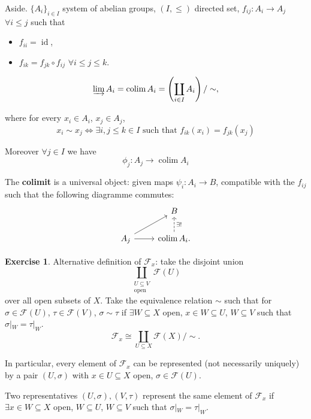 \documentclass[12pt]{article}
\DeclareMathOperator{\id}{id}
\DeclareMathOperator*{\colim}{colim}
\theoremstyle{definition}
\newtheorem*{exercise}{Exercise}
\theoremstyle{remark}
\begin{document}
Aside. $\{A_i\}_{i\in I}$ system of abelian groups, $(I,\leq)$ directed set, $f_{ij}:A_i\rightarrow A_j$ $\forall i\leq j$ such that
\begin{itemize}
\item $f_{ii}=\id$,
\item $f_{ik}=f_{jk}\circ f_{ij}$ $\forall i\leq j\leq k$.
\end{itemize}

\[\varinjlim A_i=\colim A_i=\left(\coprod_{i\in I}A_i\right)/\sim,\]

where for every $x_i\in A_i$, $x_j\in A_j$,
\[x_i\sim x_j\Leftrightarrow\exists i,j\leq k\in I\text{ such that }f_{ik}(x_i)=f_{jk}(x_j)\]

Moreover $\forall j\in I$ we have
\[\phi_j:A_j\longrightarrow\colim A_i\]

The \textbf{colimit} is a universal object: given maps $\psi_i:A_i\rightarrow B$, compatible with the $f_{ij}$ such that the following diagramme commutes:
\[
\begin{tikzcd}
&B\\
A_j\arrow[ru]\arrow[r]&\colim A_i.\arrow[u,dashed,"\exists!",swap]
\end{tikzcd}
\]

\begin{exercise}
Alternative definition of $\mathcal{F}_x$: take the disjoint union
\[\coprod_{\substack{U\subseteq V\\\text{open}}}\mathcal{F}(U)\]
over all open subsets of $X$. Take the equivalence relation $\sim$ such that for $\sigma\in\mathcal{F}(U)$, $\tau\in\mathcal{F}(V)$, $\sigma\sim\tau$ if $\exists W\subseteq X$ open, $x\in W\subseteq U$, $W\subseteq V$ such that $\sigma|_W=\tau|_W$.
\[\mathcal{F}_x\cong\coprod_{U\subseteq X}\mathcal{F}(X)/\sim.\]

In particular, every element of $\mathcal{F}_x$ can be represented (not necessarily uniquely) by a pair $(U,\sigma)$ with $x\in U\subseteq X$ open, $\sigma\in\mathcal{F}(U)$.

Two representatives $(U,\sigma),(V,\tau)$ represent the same element of $\mathcal{F}_x$ if $\exists x\in W\subseteq X$ open, $W\subseteq U$, $W\subseteq V$ such that $\sigma|_W=\tau|_W$.
\end{exercise}
\end{document}
